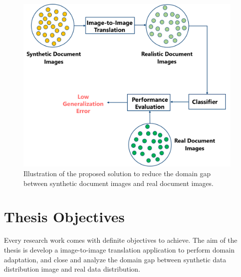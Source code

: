 \begin{figure}[H]
        \begin{center}
	    \includegraphics[scale=0.35]{images/ProposedSolution.png}
	    \caption[Illustration of the proposed solution to reduce the domain gap between synthetic document images and real document images.]{Illustration of the proposed solution to reduce the domain gap between synthetic document images and real document images.}
	    \label{fig:ProposedSolution}
	    \end{center}
\end{figure}

\section{Thesis Objectives}\label{thesisobjectives}
Every research work comes with definite objectives to achieve. The aim of the thesis is develop a image-to-image translation application to perform domain adaptation, and close and analyze the domain gap between synthetic data distribution image and real data distribution.

